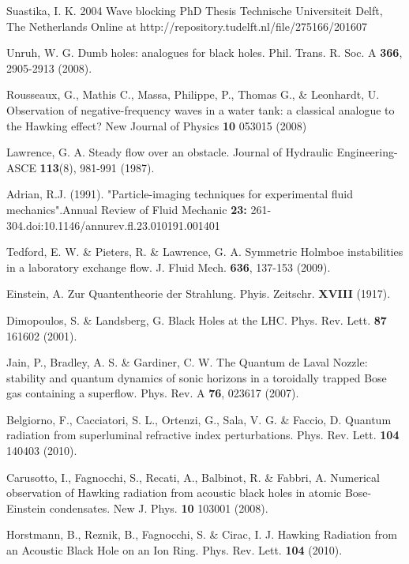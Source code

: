 \documentclass[12pt,aps%
]{revtex4}
\begin{document}
\begin{thebibliography}{99}
Suastika, I. K. 2004 Wave blocking PhD Thesis Technische Universiteit Delft,
The Netherlands Online at http://repository.tudelft.nl/file/275166/201607

Unruh, W. G. Dumb holes: analogues for black holes. Phil. Trans. R. Soc. A
{\bf 366}, 2905-2913 (2008).

 Rousseaux, G., Mathis C., Massa, Philippe, P., Thomas G., \& Leonhardt, U.
Observation of negative-frequency waves in a water tank: a classical analogue
to the Hawking effect? New Journal of Physics {\bf 10} 053015 (2008)

 Lawrence, G. A. Steady flow over an obstacle. Journal of Hydraulic
Engineering-ASCE {\bf 113}(8), 981-991 (1987).

 Adrian, R.J. (1991). "Particle-imaging techniques for experimental fluid
mechanics".Annual Review of Fluid Mechanic {\bf 23:}
261-304.doi:10.1146/annurev.fl.23.010191.001401

 Tedford, E. W. \& Pieters, R. \& Lawrence, G. A. Symmetric Holmboe
instabilities in a laboratory exchange flow. J. Fluid Mech. {\bf 636}, 137-153
(2009).

 Einstein, A. Zur Quantentheorie der Strahlung. Phyis. Zeitschr.
{\bf XVIII}
(1917).

 Dimopoulos, S. \& Landsberg, G. Black Holes at the LHC. Phys.
Rev. Lett. {\bf 87}
161602 (2001).

 Jain, P., Bradley, A. S. \& Gardiner, C. W. The Quantum de Laval Nozzle:
stability and quantum dynamics of sonic horizons in a toroidally trapped Bose
gas containing a superflow. Phys. Rev. A {\bf 76}, 023617 (2007).

Belgiorno, F., Cacciatori, S. L., Ortenzi, G., Sala, V. G. \& Faccio, D.
Quantum radiation from superluminal refractive index perturbations. Phys. Rev.
Lett. {\bf 104} 140403 (2010).

 Carusotto, I., Fagnocchi, S., Recati, A., Balbinot, R. \& Fabbri, A.
Numerical observation of Hawking radiation from acoustic black holes in atomic
Bose-Einstein condensates. New J. Phys. {\bf 10} 103001 (2008). 

 Horstmann, B., Reznik, B., Fagnocchi, S. \& Cirac, I. J. Hawking Radiation
from an Acoustic Black Hole on an Ion Ring. Phys. Rev. Lett. {\bf 104} (2010).


\end{thebibliography}

 
\end{document}
